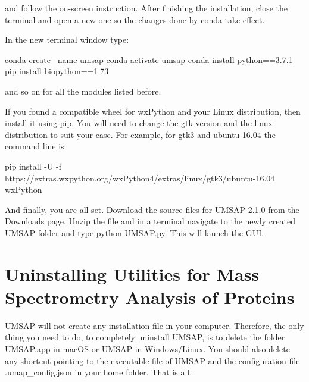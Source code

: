 and follow the on-screen instruction. After finishing the installation, close the terminal and open a new one so the changes done by conda take effect.

In the new terminal window type:

conda create --name umsap
\newline
conda activate umsap
\newline
conda install python==3.7.1
\newline
pip install biopython==1.73
\newline

and so on for all the modules listed before.

If you found a compatible wheel for wxPython and your Linux distribution, then install it using pip. You will need to change the gtk version and the linux distribution to suit your case. For example, for gtk3 and ubuntu 16.04 the command line is:

pip install -U -f https://extras.wxpython.org/wxPython4/extras/linux/gtk3/ubuntu-16.04 wxPython

And finally, you are all set. Download the source files for UMSAP \num[parse-numbers=false]{2.1.0} from the Downloads page. Unzip the file and in a terminal navigate to the newly created UMSAP folder and type python UMSAP.py. This will launch the GUI.

\section{Uninstalling Utilities for Mass Spectrometry Analysis of Proteins}

UMSAP will not create any installation file in your computer. Therefore, the only thing you need to do, to completely uninstall UMSAP, is to delete the folder UMSAP.app in macOS or UMSAP in Windows/Linux. You should also delete any shortcut pointing to the executable file of UMSAP and the configuration file .umap\_config.json in your home folder. That is all.  